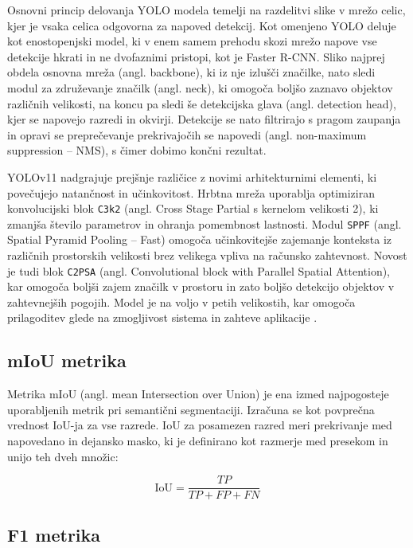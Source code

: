 \documentclass[10pt,twocolumn,letterpaper]{article}
\begin{document}
Osnovni princip delovanja YOLO modela temelji na razdelitvi slike v mrežo celic, kjer je vsaka celica odgovorna za napoved detekcij. Kot omenjeno YOLO deluje kot enostopenjski model, ki v enem samem prehodu skozi mrežo napove vse detekcije hkrati in ne dvofaznimi pristopi, kot je Faster R-CNN. Sliko najprej obdela osnovna mreža (angl. backbone), ki iz nje izlušči značilke, nato sledi modul za združevanje značilk (angl. neck), ki omogoča boljšo zaznavo objektov različnih velikosti, na koncu pa sledi še detekcijska glava (angl. detection head), kjer se napovejo razredi in okvirji. Detekcije se nato filtrirajo s pragom zaupanja in opravi se preprečevanje prekrivajočih se napovedi (angl. non-maximum suppression – NMS), s čimer dobimo končni rezultat.

YOLOv11 nadgrajuje prejšnje različice z novimi arhitekturnimi elementi, ki povečujejo natančnost in učinkovitost. Hrbtna mreža uporablja optimiziran konvolucijski blok \texttt{C3k2} (angl. Cross Stage Partial s kernelom velikosti 2), ki zmanjša število parametrov in ohranja pomembnost lastnosti. Modul \texttt{SPPF} (angl. Spatial Pyramid Pooling – Fast) omogoča učinkovitejše zajemanje konteksta iz različnih prostorskih velikosti brez velikega vpliva na računsko zahtevnost. Novost je tudi blok \texttt{C2PSA} (angl. Convolutional block with Parallel Spatial Attention), kar omogoča boljši zajem značilk v prostoru in zato boljšo detekcijo objektov v zahtevnejših pogojih. Model je na voljo v petih velikostih, kar omogoča prilagoditev glede na zmogljivost sistema in zahteve aplikacije \cite{arxiv_2410_17725}.


\subsection{mIoU metrika}

Metrika mIoU (angl. mean Intersection over Union) je ena izmed najpogosteje uporabljenih metrik pri semantični segmentaciji. Izračuna se kot povprečna vrednost IoU-ja za vse razrede. IoU za posamezen razred meri prekrivanje med napovedano in dejansko masko, ki je definirano kot razmerje med presekom in unijo teh dveh množic:

\begin{equation}
\mathrm{IoU} = \frac{TP}{TP + FP + FN}
\end{equation}

\subsection{F1 metrika}
\end{document}
